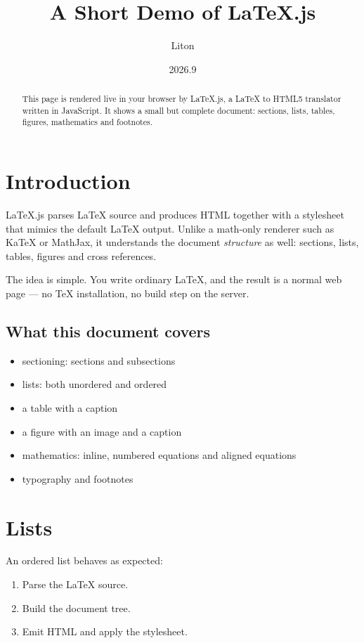 \documentclass{article}
\title{A Short Demo of \LaTeX.js}
\author{Liton}
\date{2026.9}
\begin{document}
\maketitle

\begin{abstract}
This page is rendered live in your browser by \LaTeX.js, a \LaTeX{} to HTML5
translator written in JavaScript. It shows a small but complete document:
sections, lists, tables, figures, mathematics and footnotes.
\end{abstract}

\section{Introduction}

\LaTeX.js parses \LaTeX{} source and produces HTML together with a stylesheet
that mimics the default \LaTeX{} output. Unlike a math-only renderer such as
KaTeX or MathJax, it understands the document \emph{structure} as well:
sections, lists, tables, figures and cross references.

The idea is simple. You write ordinary \LaTeX{}, and the result is a normal
web page --- no \TeX{} installation, no build step on the server.

\subsection{What this document covers}

\begin{itemize}
  \item sectioning: sections and subsections
  \item lists: both unordered and ordered
  \item a table with a caption
  \item a figure with an image and a caption
  \item mathematics: inline, numbered equations and aligned equations
  \item typography and footnotes
\end{itemize}

\section{Lists}

An ordered list behaves as expected:

\begin{enumerate}
  \item Parse the \LaTeX{} source.
  \item Build the document tree.
  \item Emit HTML and apply the stylesheet.
\end{enumerate}
\end{document}
